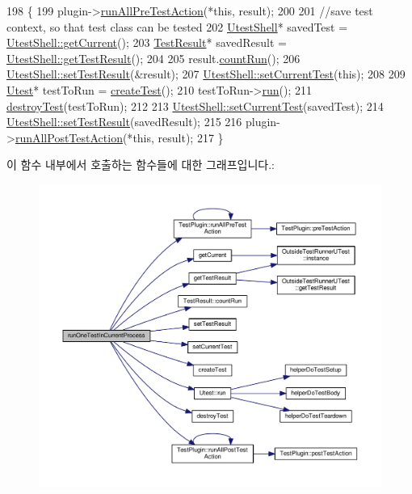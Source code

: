 \begin{DoxyCode}
198 \{
199     plugin->\hyperlink{class_test_plugin_aa3524b10b0f1613104fa75f1c1a72cf6}{runAllPreTestAction}(*\textcolor{keyword}{this}, result);
200 
201     \textcolor{comment}{//save test context, so that test class can be tested}
202     \hyperlink{class_utest_shell}{UtestShell}* savedTest = \hyperlink{class_utest_shell_afeb97f1f06324a42444c71b412655122}{UtestShell::getCurrent}();
203     \hyperlink{class_test_result}{TestResult}* savedResult = \hyperlink{class_utest_shell_a34c525b685e30431750d9e355fdfff0c}{UtestShell::getTestResult}();
204 
205     result.\hyperlink{class_test_result_a988155e11cb6bc87d669b82832848511}{countRun}();
206     \hyperlink{class_utest_shell_acaf37f2a99edd0cc27d26e030cfc0350}{UtestShell::setTestResult}(&result);
207     \hyperlink{class_utest_shell_afa8f7d2198e8ba507c1d68f3589626f1}{UtestShell::setCurrentTest}(\textcolor{keyword}{this});
208 
209     \hyperlink{class_utest}{Utest}* testToRun = \hyperlink{class_utest_shell_a7dd87cb4b46bb708bc2c1f9bffa54adb}{createTest}();
210     testToRun->\hyperlink{class_utest_a13a43e6d814de94978c515cb084873b1}{run}();
211     \hyperlink{class_utest_shell_a797d022228765f30bd7455a863011797}{destroyTest}(testToRun);
212 
213     \hyperlink{class_utest_shell_afa8f7d2198e8ba507c1d68f3589626f1}{UtestShell::setCurrentTest}(savedTest);
214     \hyperlink{class_utest_shell_acaf37f2a99edd0cc27d26e030cfc0350}{UtestShell::setTestResult}(savedResult);
215 
216     plugin->\hyperlink{class_test_plugin_ac6e93f69beb5b43b8cedf17a77ccc6b1}{runAllPostTestAction}(*\textcolor{keyword}{this}, result);
217 \}
\end{DoxyCode}


이 함수 내부에서 호출하는 함수들에 대한 그래프입니다.\+:
\nopagebreak
\begin{figure}[H]
\begin{center}
\leavevmode
\includegraphics[width=350pt]{class_utest_shell_a468a088beac3c881bdaea58bc6acaecf_cgraph}
\end{center}
\end{figure}




